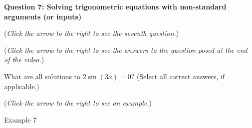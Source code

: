 \documentclass{ximera}
\begin{document}
\textbf{Question 7: Solving trigonometric equations
with non-standard arguments (or inputs)}
\begin{question}
\begin{flushright}
{\color{blue}(\emph{Click the arrow to the right to see the seventh question.})}
\end{flushright}
\begin{center}
\begin{expandable}
{\color{blue}(\emph{Click the arrow to the right to see the answers 
to the question posed at the end of the video.})}
\begin{expandable}
What are all solutions to $2\sin(3x)=0$? (Select all correct answers, if applicable.)
\begin{selectAll}
\choice{$\pi$}
\end{selectAll}
\begin{flushright}
{\color{blue}(\emph{Click the arrow to the right to see an example.})}
\end{flushright}
\begin{expandable}
Example 7
\end{expandable}
\end{expandable}
\end{expandable}
\end{center}
\end{question}
\end{document}
